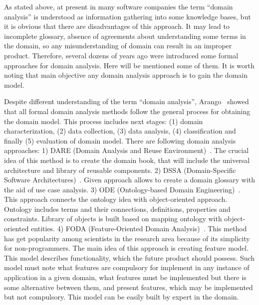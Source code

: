 \documentclass[conference]{IEEEtran}
\begin{document}
As stated above, at present in many software companies the term ``domain analysis'' is understood as information gathering into some knowledge bases, but it is obvious that there are disadvantages of this approach. It may lead to incomplete glossary, absence of agreements about understanding some terms in the domain, so any misunderstanding of domain can result in an improper product. Therefore, several dozens of years ago were introduced some formal approaches for domain analysis. Here will be mentioned some of them. It is worth noting that main objective any domain analysis approach is to gain the domain model.  

Despite different understanding of the term ``domain analysis'', Arango~\cite{arango1994domain} showed that all formal domain analysis methods follow the general process for obtaining the domain model. This process includes next stages: (1) domain characterization, (2) data collection, (3) data analysis, (4) classification and finally (5) evaluation of domain model. There are following domain analysis approaches: 1) DARE (Domain Analysis and Reuse Environment)~\cite{frakes1998dare}. The crucial idea of this method is to create the domain book, that will include the universal architecture and library of reusable components. 2) DSSA (Domain-Specific Software Architectures)~\cite{taylor1995software}. Given approach allows to create a domain glossary with the aid of use case analysis. 3) ODE (Ontology-based Domain Engineering)~\cite{falbo2002ontological}. This approach connects the ontology idea with object-oriented approach. Ontology includes  terms and their connections, definitions, properties and constraints. Library of objects is built based on mapping ontology with object-oriented entities. 4) FODA (Feature-Oriented Domain Analysis)~\cite{kang1990feature}. This method has get popularity among scientists in the research area because of its simplicity for non-programmers. The main idea of this approach is creating feature model. This model describes functionality, which the future product should possess. Such model must note what features are compulsory for implement in any instance of application in a given domain, what features must be implemented but there is some alternative between them, and present features, which may be implemented but not compulsory. This model can be easily built by expert in the domain. 
\end{document}
